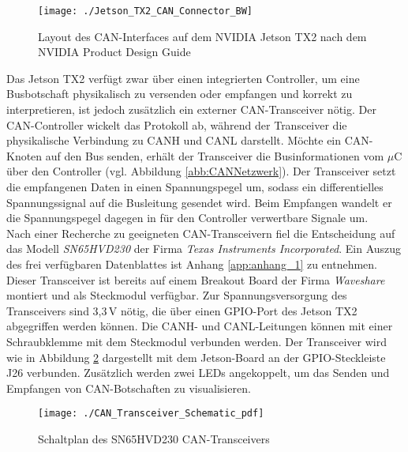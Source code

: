 \begin{figure}[!htbp]
	\centering
	\texttt{[image: ./Jetson\_TX2\_CAN\_Connector\_BW]}
	\caption{Layout des CAN-Interfaces auf dem NVIDIA Jetson TX2 nach dem NVIDIA Product Design Guide \cite{NVIDIACorporation.2017}}
	\label{abb:JetsonTX2CANConnector_BW}
\end{figure}

Das Jetson TX2 verfügt zwar über einen integrierten Controller, um eine Busbotschaft physikalisch zu versenden oder empfangen und korrekt zu interpretieren, ist jedoch zusätzlich ein externer CAN-Transceiver nötig. Der CAN-Controller wickelt das Protokoll ab, während der Transceiver die physikalische Verbindung zu CANH und CANL darstellt. Möchte ein CAN-Knoten auf den Bus senden, erhält der Transceiver die Businformationen vom $\mu$C über den Controller (vgl. Abbildung \ref{abb:CANNetzwerk}). Der Transceiver setzt die empfangenen Daten in einen Spannungspegel um, sodass ein differentielles Spannungssignal auf die Busleitung gesendet wird. Beim Empfangen wandelt er die Spannungspegel dagegen in für den Controller verwertbare Signale um.\\
Nach einer Recherche zu geeigneten CAN-Transceivern fiel die Entscheidung auf das Modell \emph{SN65HVD230} der Firma \emph{Texas Instruments Incorporated}. Ein Auszug des frei verfügbaren Datenblattes ist Anhang \ref{app:anhang_1} zu entnehmen. Dieser Transceiver ist bereits auf einem Breakout Board der Firma \emph{Waveshare} montiert und als Steckmodul verfügbar. Zur Spannungsversorgung des Transceivers sind 3,3\,V nötig, die über einen GPIO-Port des Jetson TX2 abgegriffen werden können. Die CANH- und CANL-Leitungen können mit einer Schraubklemme mit dem Steckmodul verbunden werden. Der Transceiver wird wie in Abbildung \ref{abb:AnschlussbelegungTransceiver} dargestellt mit dem Jetson-Board an der GPIO-Steckleiste J26 verbunden. Zusätzlich werden zwei LEDs angekoppelt, um das Senden und Empfangen von CAN-Botschaften zu visualisieren.

\begin{figure}[!htbp]
	\centering
	\texttt{[image: ./CAN\_Transceiver\_Schematic\_pdf]}
	\caption{Schaltplan des SN65HVD230 CAN-Transceivers}
	\label{abb:AnschlussbelegungTransceiver}
\end{figure}

